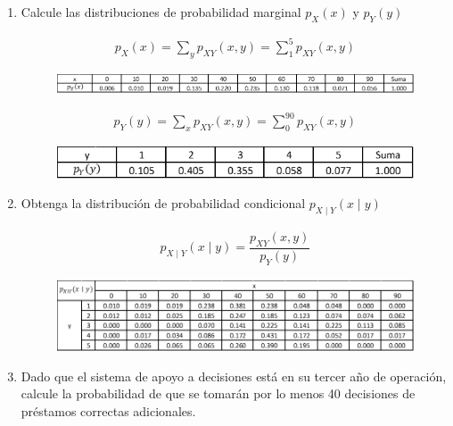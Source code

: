 \documentclass[12pt]{report}
\newcommand{\linejump}{\hfill \break}
\begin{document}
  \linejump
  \begin{enumerate}
    \item Calcule las distribuciones de probabilidad marginal $p_X(x)$ y $p_Y(y)$
    
    \begin{align*}
      p_X(x) = \sum_y p_{XY}(x, y) = \sum_1^5 p_{XY}(x,y)
    \end{align*}

    \begin{figure}[h!]
      \centering
      \includegraphics[width=0.9\linewidth]{Tpx.png}
    \end{figure}

    \begin{align*}
      p_Y(y) = \sum_x p_{XY}(x, y) = \sum_0^{90} p_{XY}(x,y)
    \end{align*}

    \begin{figure}[h!]
      \centering
      \includegraphics[width=0.55\linewidth]{Tpy.png}
    \end{figure}

    \item Obtenga la distribución de probabilidad condicional $p_{X \mid Y}(x \mid y)$
    
    \begin{align*}
      p_{X \mid Y}(x \mid y) = \dfrac{p_{XY}(x, y)}{p_Y(y)}
    \end{align*}
    
    \begin{figure}[h!]
      \centering
      \includegraphics[width=0.9\linewidth]{Tpxmy.png} 
    \end{figure}

    \newpage
    \item Dado que el sistema de apoyo a decisiones está en su tercer año de operación, calcule la probabilidad de que se tomarán por lo menos 40 decisiones de préstamos correctas adicionales.
    

\end{enumerate}
\end{document}
